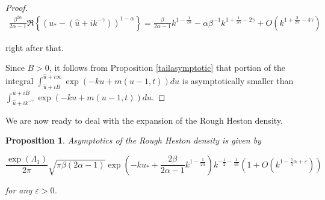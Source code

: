 \documentclass[12pt]{article}
\theoremstyle{plain}
\newtheorem{proposition}{Proposition}[section]
\begin{document}
\begin{proof}
$$
\begin{aligned}
\frac{\beta^{2\alpha}}{2\alpha-1}\Re\left\{(u_*-(\hat u + ik^{-\gamma}))^{1-\alpha}\right\} = \frac{\beta}{2\alpha-1}k^{1-\frac{1}{2\alpha}} - \alpha \beta^{-1}k^{1+\frac{1}{2\alpha}-2\gamma} + O(k^{1+\frac{3}{2\alpha}-4\gamma})
\end{aligned}
$$

right after that.

Since $B>0$, it follows from Proposition \ref{tailasymptotic} that portion of the integral $\int_{\hat u +i B} ^{\hat u + i \infty} \exp(-ku + m(u-1,t))du$ is asymptotically smaller than $\int_{\hat u +i k^{-\gamma}} ^{\hat u + i B} \exp(-ku + m(u-1,t))du$.

\end{proof}

We are now ready to deal with the expansion of the Rough Heston density.

\begin{proposition}

Asymptotics of the Rough Heston density is given by

$$
\frac{\exp\left(\Lambda_1\right)}{2\pi} \sqrt {\pi\beta(2\alpha-1)} \exp\left(-k u_* +  \frac{2\beta}{2\alpha - 1}k^{1-\frac{1}{2\alpha}}\right) k^{-\frac 12 -\frac{1}{4\alpha}} \left(1+O(k^{1-\frac 54 \alpha + \varepsilon})\right)
$$

for any $\varepsilon > 0$.

\end{proposition}
\end{document}
